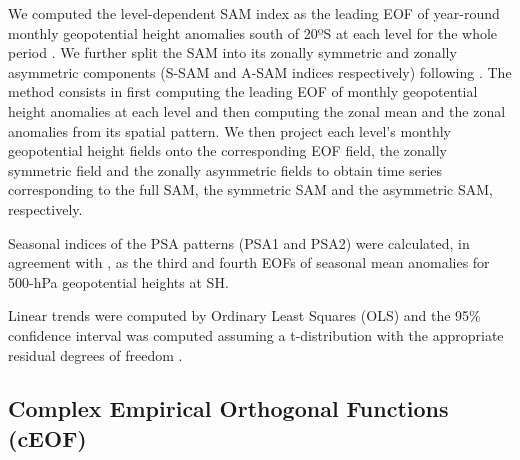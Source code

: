 \documentclass[pdflatex,lineno,sn-basic]{sn-jnl}
\theoremstyle{thmstyleone}%
\theoremstyle{thmstyletwo}%
\theoremstyle{thmstylethree}%
\begin{document}
We computed the level-dependent SAM index as the leading EOF of year-round monthly geopotential height anomalies south of 20ºS at each level for the whole period \citep{baldwin2009}.
We further split the SAM into its zonally symmetric and zonally asymmetric components (S-SAM and A-SAM indices respectively) following \citet{campitelli2022}.
The method consists in first computing the leading EOF of monthly geopotential height anomalies at each level and then computing the zonal mean and the zonal anomalies from its spatial pattern.
We then project each level's monthly geopotential height fields onto the corresponding EOF field, the zonally symmetric field and the zonally asymmetric fields to obtain time series corresponding to the full SAM, the symmetric SAM and the asymmetric SAM, respectively.

Seasonal indices of the PSA patterns (PSA1 and PSA2) were calculated, in agreement with \citet{mo2001}, as the third and fourth EOFs of seasonal mean anomalies for 500-hPa geopotential heights at SH.

Linear trends were computed by Ordinary Least Squares (OLS) and the 95\% confidence interval was computed assuming a t-distribution with the appropriate residual degrees of freedom \citep{wilks2011}.

\hypertarget{ceof-methods}{%
\subsection{Complex Empirical Orthogonal Functions (cEOF)}\label{ceof-methods}}
\end{document}
